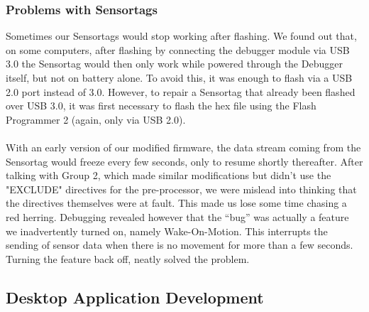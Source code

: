 \documentclass[hidelinks,conference,12pt]{IEEETran}
\begin{document}
\subsubsection{Problems with Sensortags}
Sometimes our Sensortags would stop working after flashing. We found out that, on some computers, after flashing by connecting the debugger module via USB 3.0 the Sensortag would then only work while powered through the Debugger itself, but not on battery alone. To avoid this, it was enough to flash via a USB 2.0 port instead of 3.0. However, to repair a Sensortag  that already been flashed over USB 3.0, it was first necessary to flash the hex file using the Flash Programmer 2 (again, only via USB 2.0).\\\\
With an early version of our modified firmware, the data stream coming from the Sensortag would freeze every few seconds, only to resume shortly thereafter. After talking with Group 2, which made similar modifications but didn’t use the "EXCLUDE" directives for the pre-processor, we were mislead into thinking that the directives themselves were at fault. This made us lose some time chasing a red herring. Debugging revealed however that the “bug” was actually a feature we inadvertently turned on, namely  Wake-On-Motion. This interrupts the sending of sensor data when there is no movement for more than a few seconds. Turning the feature back off, neatly solved the problem.

\subsection{Desktop Application Development}
\end{document}
